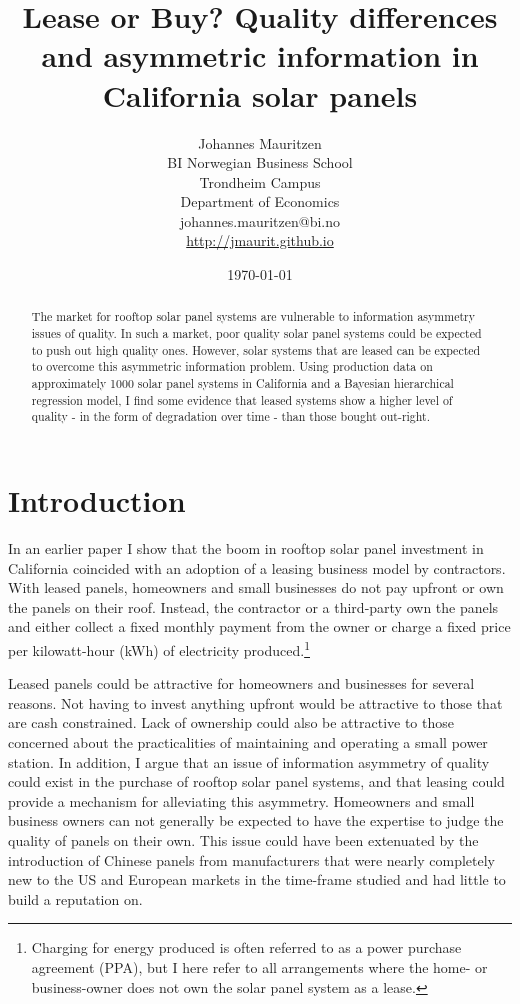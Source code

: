 \documentclass[12pt]{article}
\title{Lease or Buy? Quality differences and asymmetric information in California solar panels}
\date{\today}
\author{Johannes Mauritzen \\ BI Norwegian Business School \\ Trondheim Campus \\ Department of Economics \\ johannes.mauritzen@bi.no\\\url{http://jmaurit.github.io}}
\begin{document}
 \begin{spacing}{1} %
	\maketitle

\begin{abstract}
 The market for rooftop solar panel systems are vulnerable to information asymmetry issues of quality. In such a market, poor quality solar panel systems could be expected to push out high quality ones. However, solar systems that are leased can be expected to overcome this asymmetric information problem. Using production data on approximately 1000 solar panel systems in California and a Bayesian hierarchical regression model, I find some evidence that leased systems show a higher level of quality - in the form of degradation over time - than those bought out-right.
\end{abstract}

 \end{spacing}

\section{Introduction}
In an earlier paper \citep{mauritzen_whats_2015} I show that the boom in rooftop solar panel investment in California coincided with an adoption of a leasing business model by contractors. With leased panels, homeowners and small businesses do not pay upfront or own the panels on their roof. Instead, the contractor or a third-party own the panels and either collect a fixed monthly payment from the owner or charge a fixed price per kilowatt-hour (kWh) of electricity produced.\footnote{Charging for energy produced is often referred to as a power purchase agreement (PPA), but I here refer to all arrangements where the home- or business-owner does not own the solar panel system as a lease.}

Leased panels could be attractive for homeowners and businesses for several reasons. Not having to invest anything upfront would be attractive to those that are cash constrained. Lack of ownership could also be attractive to those concerned about the practicalities of maintaining and operating a small power station. 
In addition, I argue that an issue of information asymmetry of quality could exist in the purchase of rooftop solar panel systems, and that leasing could provide a mechanism for alleviating this asymmetry. Homeowners and small business owners can not generally be expected to have the expertise to judge the quality of panels on their own. This issue could have been extenuated by the introduction of Chinese panels from manufacturers that were nearly completely new to the US and European markets in the time-frame studied and had little to build a reputation on. 
\end{document}

